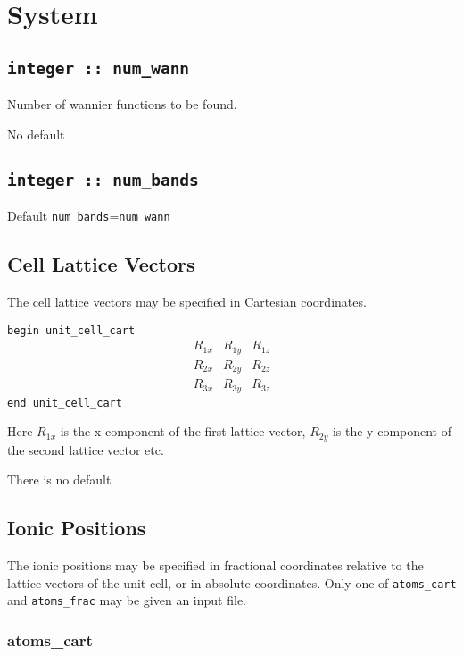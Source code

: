 \clearpage


\section{System}

\subsection[num\_wann]{\tt integer :: num\_wann}
Number of wannier functions to be found.

No default

\subsection[num\_bands]{\tt integer :: num\_bands}

Default \verb#num_bands#=\verb#num_wann#

\subsection[Cell Lattice Vectors]{Cell Lattice Vectors}

The cell lattice vectors may be specified in Cartesian coordinates.


\noindent \verb#begin unit_cell_cart# \\
$$
\begin{array}{ccc}
R_{1x} & R_{1y} & R_{1z} \\
R_{2x} & R_{2y} & R_{2z} \\
R_{3x} & R_{3y} & R_{3z}
\end{array}
$$
\verb#end unit_cell_cart#

Here $R_{1x}$ is the x-component of the first lattice vector,
$R_{2y}$ is the y-component of the second lattice vector etc.

There is no default


\subsection[Ionic Positions]{Ionic Positions}

The ionic positions may be specified in fractional coordinates relative
to the lattice vectors of the unit cell, or in absolute coordinates.
Only one of \verb#atoms_cart# and \verb#atoms_frac# may be given an input
file.

\subsubsection{atoms\_cart}
 

